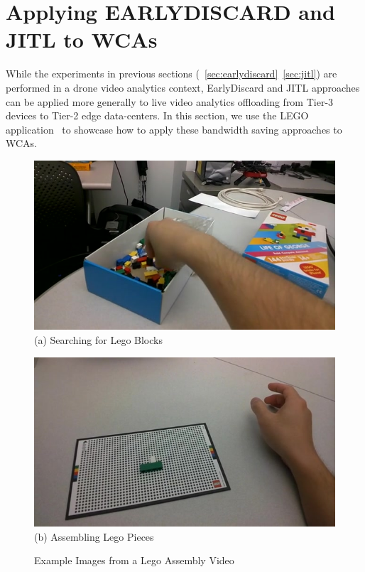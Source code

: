 \section{Applying EARLYDISCARD and JITL to WCAs}
\label{bw:wca}

While the experiments in previous sections
(~\ref{sec:earlydiscard}~\ref{sec:jitl}) are performed in a drone video
analytics context, EarlyDiscard and JITL approaches can be applied more
generally to live video analytics offloading from Tier-3 devices to Tier-2 edge
data-centers. In this section, we use the LEGO
application~\cite{chen2018application} to showcase how to apply these bandwidth
saving approaches to WCAs.

\begin{figure}
\centering
\begin{minipage}[]{0.45\linewidth}
\centering
    \includegraphics[width=\linewidth]{FIGS/lego-search}\\
{(a) Searching for Lego Blocks}
\end{minipage}
\begin{minipage}[]{0.45\linewidth}
\centering
\includegraphics[width=\linewidth]{FIGS/lego-assembled}\\
{(b) Assembling Lego Pieces}
\end{minipage}
\caption{Example Images from a Lego Assembly Video}
\label{fig:wca-lego-example-images}
\end{figure}

